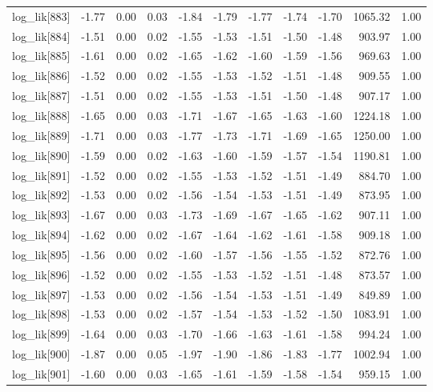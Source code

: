 \begin{table}[ht]
\begin{tabular}{rrrrrrrrrrr}
  log\_lik[883] & -1.77 & 0.00 & 0.03 & -1.84 & -1.79 & -1.77 & -1.74 & -1.70 & 1065.32 & 1.00 \\ 
  log\_lik[884] & -1.51 & 0.00 & 0.02 & -1.55 & -1.53 & -1.51 & -1.50 & -1.48 & 903.97 & 1.00 \\ 
  log\_lik[885] & -1.61 & 0.00 & 0.02 & -1.65 & -1.62 & -1.60 & -1.59 & -1.56 & 969.63 & 1.00 \\ 
  log\_lik[886] & -1.52 & 0.00 & 0.02 & -1.55 & -1.53 & -1.52 & -1.51 & -1.48 & 909.55 & 1.00 \\ 
  log\_lik[887] & -1.51 & 0.00 & 0.02 & -1.55 & -1.53 & -1.51 & -1.50 & -1.48 & 907.17 & 1.00 \\ 
  log\_lik[888] & -1.65 & 0.00 & 0.03 & -1.71 & -1.67 & -1.65 & -1.63 & -1.60 & 1224.18 & 1.00 \\ 
  log\_lik[889] & -1.71 & 0.00 & 0.03 & -1.77 & -1.73 & -1.71 & -1.69 & -1.65 & 1250.00 & 1.00 \\ 
  log\_lik[890] & -1.59 & 0.00 & 0.02 & -1.63 & -1.60 & -1.59 & -1.57 & -1.54 & 1190.81 & 1.00 \\ 
  log\_lik[891] & -1.52 & 0.00 & 0.02 & -1.55 & -1.53 & -1.52 & -1.51 & -1.49 & 884.70 & 1.00 \\ 
  log\_lik[892] & -1.53 & 0.00 & 0.02 & -1.56 & -1.54 & -1.53 & -1.51 & -1.49 & 873.95 & 1.00 \\ 
  log\_lik[893] & -1.67 & 0.00 & 0.03 & -1.73 & -1.69 & -1.67 & -1.65 & -1.62 & 907.11 & 1.00 \\ 
  log\_lik[894] & -1.62 & 0.00 & 0.02 & -1.67 & -1.64 & -1.62 & -1.61 & -1.58 & 909.18 & 1.00 \\ 
  log\_lik[895] & -1.56 & 0.00 & 0.02 & -1.60 & -1.57 & -1.56 & -1.55 & -1.52 & 872.76 & 1.00 \\ 
  log\_lik[896] & -1.52 & 0.00 & 0.02 & -1.55 & -1.53 & -1.52 & -1.51 & -1.48 & 873.57 & 1.00 \\ 
  log\_lik[897] & -1.53 & 0.00 & 0.02 & -1.56 & -1.54 & -1.53 & -1.51 & -1.49 & 849.89 & 1.00 \\ 
  log\_lik[898] & -1.53 & 0.00 & 0.02 & -1.57 & -1.54 & -1.53 & -1.52 & -1.50 & 1083.91 & 1.00 \\ 
  log\_lik[899] & -1.64 & 0.00 & 0.03 & -1.70 & -1.66 & -1.63 & -1.61 & -1.58 & 994.24 & 1.00 \\ 
  log\_lik[900] & -1.87 & 0.00 & 0.05 & -1.97 & -1.90 & -1.86 & -1.83 & -1.77 & 1002.94 & 1.00 \\ 
  log\_lik[901] & -1.60 & 0.00 & 0.03 & -1.65 & -1.61 & -1.59 & -1.58 & -1.54 & 959.15 & 1.00 \\ 

\end{tabular}
\end{table}
